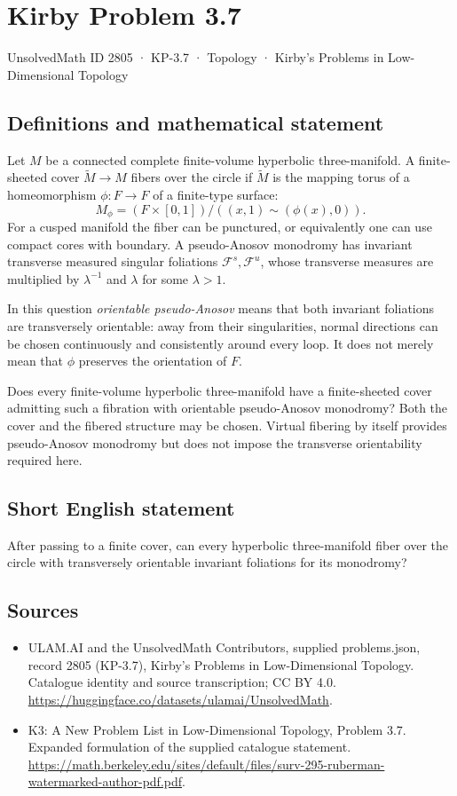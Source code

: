 \documentclass[11pt,a4paper]{article}
\begin{document}
\section*{Kirby Problem 3.7}\label{2805}
{\small UnsolvedMath ID 2805 · KP-3.7 · Topology · Kirby's Problems in Low-Dimensional Topology}
\subsection{Definitions and mathematical statement}
Let $M$ be a connected complete finite-volume hyperbolic three-manifold.
A finite-sheeted cover $\widetilde M\to M$ fibers over the circle if
$\widetilde M$ is the mapping torus of a homeomorphism
$\phi:F\to F$ of a finite-type surface:
\[
 M_\phi=(F\times[0,1])/((x,1)\sim(\phi(x),0)).
\]
For a cusped manifold the fiber can be punctured, or equivalently one can
use compact cores with boundary. A pseudo-Anosov monodromy has invariant
transverse measured singular foliations $\mathcal F^s,\mathcal F^u$, whose
transverse measures are multiplied by $\lambda^{-1}$ and $\lambda$ for
some $\lambda>1$.

In this question \emph{orientable pseudo-Anosov} means that both invariant
foliations are transversely orientable: away from their singularities, normal
directions can be chosen continuously and consistently around every loop.
It does not merely mean that $\phi$ preserves the orientation of $F$.

Does every finite-volume hyperbolic three-manifold have a finite-sheeted
cover admitting such a fibration with orientable pseudo-Anosov monodromy?
Both the cover and the fibered structure may be chosen. Virtual fibering by
itself provides pseudo-Anosov monodromy but does not impose the transverse
orientability required here.
\subsection{Short English statement}
After passing to a finite cover, can every hyperbolic three-manifold fiber over the circle with transversely orientable invariant foliations for its monodromy?
\subsection{Sources}
\begin{itemize}
\item[S1] ULAM.AI and the UnsolvedMath Contributors, supplied problems.json, record 2805 (KP-3.7), Kirby's Problems in Low-Dimensional Topology. Catalogue identity and source transcription; CC BY 4.0.
\url{https://huggingface.co/datasets/ulamai/UnsolvedMath}.
\item[S2] K3: A New Problem List in Low-Dimensional Topology, Problem 3.7. Expanded formulation of the supplied catalogue statement.
\url{https://math.berkeley.edu/sites/default/files/surv-295-ruberman-watermarked-author-pdf.pdf}.
\end{itemize}
\end{document}
